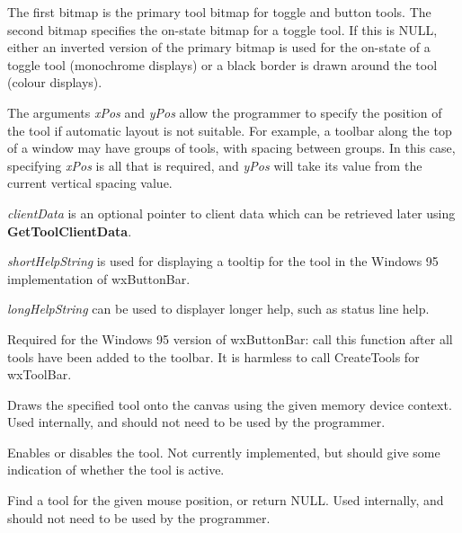 The first bitmap is the primary tool bitmap for toggle and button
tools. The second bitmap specifies the on-state bitmap for a toggle
tool. If this is NULL, either an inverted version of the primary bitmap is
used for the on-state of a toggle tool (monochrome displays) or a black
border is drawn around the tool (colour displays).

The arguments {\it xPos} and {\it yPos} allow the programmer to specify
the position of the tool if automatic layout is not suitable. For
example, a toolbar along the top of a window may have groups of tools,
with spacing between groups. In this case, specifying {\it xPos} is all
that is required, and {\it yPos} will take its value from the current
vertical spacing value.

{\it clientData} is an optional pointer to client data which can be
retrieved later using {\bf GetToolClientData}.

{\it shortHelpString} is used for displaying a tooltip for the tool in the
Windows 95 implementation of wxButtonBar.

{\it longHelpString} can be used to displayer longer help, such as status line help.



Required for the Windows 95 version of wxButtonBar: call this function after all
tools have been added to the toolbar. It is harmless to call CreateTools for
wxToolBar.



Draws the specified tool onto the canvas using the given memory device context.
Used internally, and should not need to be used by the programmer.



Enables or disables the tool. Not currently implemented, but should give some
indication of whether the tool is active.



Find a tool for the given mouse position, or return NULL. Used
internally, and should not need to be used by the programmer.

